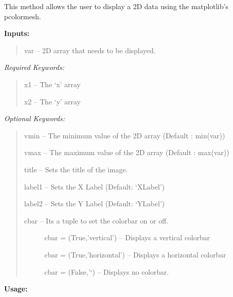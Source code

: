 \documentclass[letterpaper,10pt,english]{sphinxmanual}
\begin{document}
\begin{fulllineitems}
\begin{fulllineitems}





\end{fulllineitems}


\begin{fulllineitems}
\label{image:pyPLUTO.Image.pldisplay}
This method allows the user to display a 2D data using the matplotlib's pcolormesh.

\textbf{Inputs:}
\begin{quote}

var -- 2D array that needs to be displayed.
\end{quote}

\emph{Required Keywords:}
\begin{quote}

x1 -- The `x' array

x2 -- The `y' array
\end{quote}

\emph{Optional Keywords:}
\begin{quote}

vmin -- The minimum value of the 2D array (Default : min(var))

vmax -- The maximum value of the 2D array (Default : max(var))

title -- Sets the title of the image.

label1 -- Sets the X Label (Default: `XLabel')

label2 -- Sets the Y Label (Default: `YLabel')
\begin{description}
\item[{cbar -- Its a tuple to set the colorbar on or off. }] \leavevmode
cbar = (True,'vertical') -- Displays a vertical colorbar

cbar = (True,'horizontal') -- Displays a horizontal colorbar

cbar = (False,'`) -- Displays no colorbar.

\end{description}
\end{quote}

\textbf{Usage:}
\begin{quote}


\end{quote}
\end{fulllineitems}
\end{fulllineitems}
\end{document}
